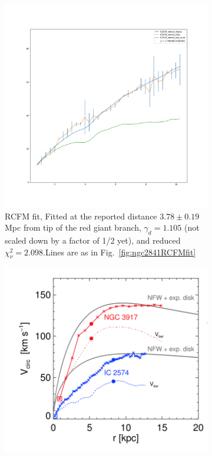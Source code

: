 \documentclass[reprint,%
 amsmath,amssymb,
 aps,
]{revtex4-1}
\begin{document}
 
 \begin{figure}[ht] 
  \begin{subfigure}[b]{0.5\linewidth}
    \centering
    \includegraphics[width=0.95\linewidth]{figures/IC2574_rotmod_XueSofue.png} 
    \caption{  RCFM fit, 
    Fitted at the reported   distance $3.78 ± 0.19 $ Mpc from tip of the red giant branch, $\gamma_d = 1.105 $ (not scaled down by a factor of 1/2 yet), and reduced $\chi^2_\nu = 2.098  $.Lines are as in Fig.~\ref{fig:ngc2841RCFMfit}
    } 
    \label{fig:IC2574} 
    \vspace{4ex}
  \end{subfigure}%
  \begin{subfigure}[b]{0.5\linewidth}
    \centering
    \includegraphics[width=0.95\linewidth]{figures/Navarro2017Fig3.png} 

\end{subfigure}
\end{figure}
\end{document}
